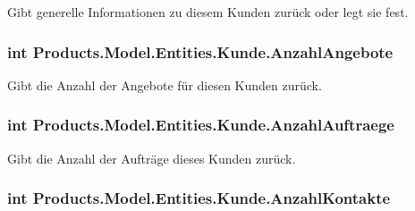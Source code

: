 Gibt generelle Informationen zu diesem Kunden zurück oder legt sie fest. 

\subsubsection[{\texorpdfstring{Anzahl\+Angebote}{AnzahlAngebote}}]{\setlength{\rightskip}{0pt plus 5cm}int Products.\+Model.\+Entities.\+Kunde.\+Anzahl\+Angebote\hspace{0.3cm}{\ttfamily [get]}}\hypertarget{class_products_1_1_model_1_1_entities_1_1_kunde_a587f996868b9d8de13d20b227b72ad14}{}\label{class_products_1_1_model_1_1_entities_1_1_kunde_a587f996868b9d8de13d20b227b72ad14}


Gibt die Anzahl der Angebote für diesen Kunden zurück. 

\subsubsection[{\texorpdfstring{Anzahl\+Auftraege}{AnzahlAuftraege}}]{\setlength{\rightskip}{0pt plus 5cm}int Products.\+Model.\+Entities.\+Kunde.\+Anzahl\+Auftraege\hspace{0.3cm}{\ttfamily [get]}}\hypertarget{class_products_1_1_model_1_1_entities_1_1_kunde_a45a2d6e5926f35ddb7c7d0e6c2f56a83}{}\label{class_products_1_1_model_1_1_entities_1_1_kunde_a45a2d6e5926f35ddb7c7d0e6c2f56a83}


Gibt die Anzahl der Aufträge dieses Kunden zurück. 

\subsubsection[{\texorpdfstring{Anzahl\+Kontakte}{AnzahlKontakte}}]{\setlength{\rightskip}{0pt plus 5cm}int Products.\+Model.\+Entities.\+Kunde.\+Anzahl\+Kontakte\hspace{0.3cm}{\ttfamily [get]}}\hypertarget{class_products_1_1_model_1_1_entities_1_1_kunde_aa0ad94515b3f9e049a4442c4e275d93b}{}\label{class_products_1_1_model_1_1_entities_1_1_kunde_aa0ad94515b3f9e049a4442c4e275d93b}


